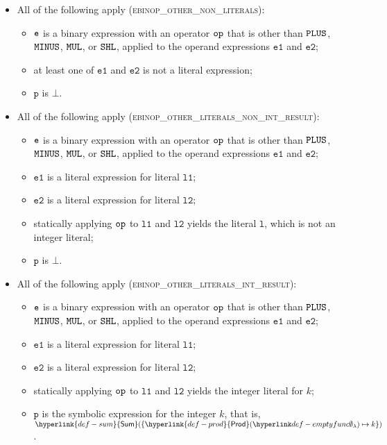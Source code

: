 \documentclass{book}
\newcommand\Prod[0]{\hyperlink{def-prod}{\textsf{Prod}}}
\newcommand\Sum[0]{\hyperlink{def-sum}{\textsf{Sum}}}
\newcommand\vl[0]{\texttt{l}}
\newcommand\vp[0]{\texttt{p}}
\newcommand\veone[0]{\texttt{e1}}
\newcommand\vetwo[0]{\texttt{e2}}
\newcommand\vlone[0]{\texttt{l1}}
\newcommand\vltwo[0]{\texttt{l2}}
\begin{document}
\begin{itemize}
  \item All of the following apply (\textsc{ebinop\_other\_non\_literals}):
  \begin{itemize}
    \item $\texttt{e}$ is a binary expression with an operator $\texttt{op}$ that is other than $\texttt{PLUS}$, $\texttt{MINUS}$, $\texttt{MUL}$, or $\texttt{SHL}$,
          applied to the operand expressions $\veone$ and $\vetwo$;
    \item at least one of $\veone$ and $\vetwo$ is not a literal expression;
    \item $\vp$ is $\bot$.
  \end{itemize}

  \item All of the following apply (\textsc{ebinop\_other\_literals\_non\_int\_result}):
  \begin{itemize}
    \item $\texttt{e}$ is a binary expression with an operator $\texttt{op}$ that is other than $\texttt{PLUS}$, $\texttt{MINUS}$, $\texttt{MUL}$, or $\texttt{SHL}$,
          applied to the operand expressions $\veone$ and $\vetwo$;
    \item $\veone$ is a literal expression for literal $\vlone$;
    \item $\vetwo$ is a literal expression for literal $\vltwo$;
    \item statically applying $\texttt{op}$ to $\vlone$ and $\vltwo$ yields the literal $\vl$, which is not an integer literal;
    \item $\vp$ is $\bot$.
  \end{itemize}

  \item All of the following apply (\textsc{ebinop\_other\_literals\_int\_result}):
  \begin{itemize}
    \item $\texttt{e}$ is a binary expression with an operator $\texttt{op}$ that is other than $\texttt{PLUS}$, $\texttt{MINUS}$, $\texttt{MUL}$, or $\texttt{SHL}$,
          applied to the operand expressions $\veone$ and $\vetwo$;
    \item $\veone$ is a literal expression for literal $\vlone$;
    \item $\vetwo$ is a literal expression for literal $\vltwo$;
    \item statically applying $\texttt{op}$ to $\vlone$ and $\vltwo$ yields the integer literal for $k$;
    \item $\vp$ is the symbolic expression for the integer $k$, that is, $\Sum( \{ \Prod(\emptyfunc)\mapsto k \} )$.
  \end{itemize}


\end{itemize}
\end{document}
